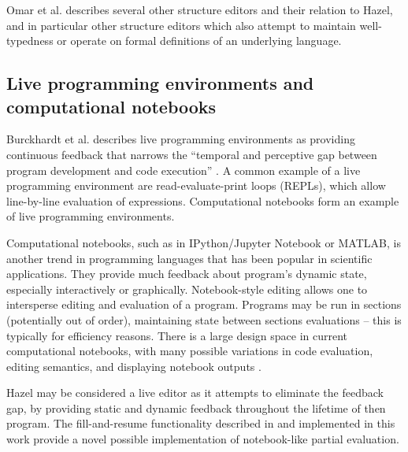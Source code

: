 Omar et al. \cite{conf/popl/Hazelnut17} describes several other structure editors and their relation to Hazel, and in particular other structure editors which also attempt to maintain well-typedness or operate on formal definitions of an underlying language.

\subsection{Live programming environments and computational notebooks}
\label{sec:notebook-editors}

Burckhardt et al. describes live programming environments as providing continuous feedback that narrows the ``temporal and perceptive gap between program development and code execution''
 \cite{10.1145/2499370.2462170}. A common example of a live programming environment are read-evaluate-print loops (REPLs), which allow line-by-line evaluation of expressions. Computational notebooks form an example of live programming environments.

Computational notebooks, such as in IPython/Jupyter Notebook \cite{perez2007ipython} or MATLAB, is another trend in programming languages that has been popular in scientific applications. They provide much feedback about program's dynamic state, especially interactively or graphically. Notebook-style editing allows one to intersperse editing and evaluation of a program. Programs may be run in sections (potentially out of order), maintaining state between sections evaluations -- this is typically for efficiency reasons. There is a large design space in current computational notebooks, with many possible variations in code evaluation, editing semantics, and displaying notebook outputs \cite{lau2020design}.

Hazel may be considered a live editor as it attempts to eliminate the feedback gap, by providing static and dynamic feedback throughout the lifetime of then program. The fill-and-resume functionality described in \cite{conf/popl/HazelnutLive19} and implemented in this work provide a novel possible implementation of notebook-like partial evaluation.

